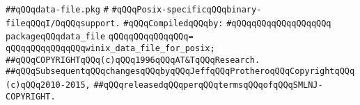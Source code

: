 \label{src/lib/std/src/posix/data-file.pkg}
\verb|##qQQqdata-file.pkg|\newline
\verb|#|\newline
\verb|#qQQqPosix-specificqQQqbinary-fileqQQqI/OqQQqsupport.|\newline
\newline
\verb|#qQQqCompiledqQQqby:|\newline
\verb|#qQQqqQQqqQQqqQQqqQQq|\newline
\newline
\verb|packageqQQqdata_file|\newline
\verb|qQQqqQQqqQQqqQQq=|\newline
\verb|qQQqqQQqqQQqqQQqwinix_data_file_for_posix;|\newline
\newline
\newline
\newline
\verb|##qQQqCOPYRIGHTqQQq(c)qQQq1996qQQqAT&TqQQqResearch.|\newline
\verb|##qQQqSubsequentqQQqchangesqQQqbyqQQqJeffqQQqProtheroqQQqCopyrightqQQq(c)qQQq2010-2015,|\newline
\verb|##qQQqreleasedqQQqperqQQqtermsqQQqofqQQqSMLNJ-COPYRIGHT.|\newline

